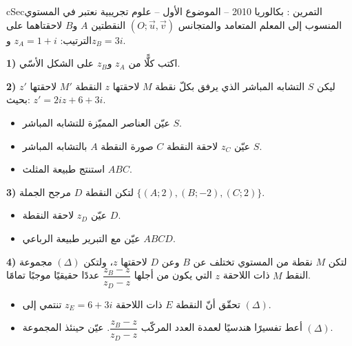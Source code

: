 \documentclass[12pt,a4paper]{article}
\newenvironment{BOX}[2]{\begin{otherlanguage}{english}\begin{arbox}{#1}{#2}}{\end{arbox}\end{otherlanguage}}
\newcounter{exo}
\newenvironment{tamrin}[1]{\stepcounter{exo}\begin{BOX}{cSec}{التمرين \theexo: #1}}{\end{BOX}}
\newenvironment{sq}{\begin{itemize}[leftmargin=2.4em,itemsep=3pt]}{\end{itemize}}
\newcommand{\qa}{\item[(أ)]}\newcommand{\qb}{\item[(ب)]}\newcommand{\qc}{\item[(جـ)]}\newcommand{\qd}{\item[(د)]}\newcommand{\qe}{\item[(هـ)]}
\begin{document}
\begin{tamrin}{بكالوريا 2010 -- الموضوع الأول -- علوم تجريبية}
نعتبر في المستوي المنسوب إلى المعلم المتعامد والمتجانس $(O;\vec u,\vec v)$ النقطتين $A$ و$B$ لاحقتاهما على الترتيب: $z_A=1+i$ و$z_B=3i$.

\textbf{1)} اكتب كلًّا من $z_A$ و$z_B$ على الشكل الأسّي.

\textbf{2)} ليكن $S$ التشابه المباشر الذي يرفق بكلّ نقطة $M$ لاحقتها $z$ النقطة $M'$ لاحقتها $z'$ بحيث: $z'=2iz+6+3i$.
\begin{sq}
\qa عيّن العناصر المميّزة للتشابه المباشر $S$.
\qb عيّن $z_C$ لاحقة النقطة $C$ صورة النقطة $A$ بالتشابه المباشر $S$.
\qc استنتج طبيعة المثلث $ABC$.
\end{sq}
\textbf{3)} لتكن النقطة $D$ مرجح الجملة $\{(A;2),(B;-2),(C;2)\}$.
\begin{sq}
\qa عيّن $z_D$ لاحقة النقطة $D$.
\qb عيّن مع التبرير طبيعة الرباعي $ABCD$.
\end{sq}
\textbf{4)} لتكن $M$ نقطة من المستوي تختلف عن $B$ وعن $D$ لاحقتها $z$، ولتكن $(\Delta)$ مجموعة النقط $M$ ذات اللاحقة $z$ التي يكون من أجلها $\dfrac{z_B-z}{z_D-z}$ عددًا حقيقيًا موجبًا تمامًا.
\begin{sq}
\qa تحقّق أنّ النقطة $E$ ذات اللاحقة $z_E=6+3i$ تنتمي إلى $(\Delta)$.
\qb أعط تفسيرًا هندسيًا لعمدة العدد المركّب $\dfrac{z_B-z}{z_D-z}$. عيّن حينئذ المجموعة $(\Delta)$.
\end{sq}
\end{tamrin}
\end{document}
